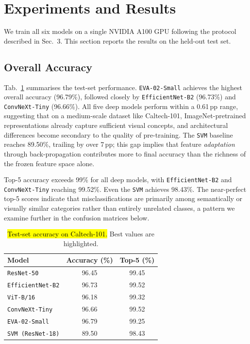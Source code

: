 \section{Experiments and Results}

We train all six models on a single NVIDIA A100 GPU following the protocol described in Sec.~3. This section reports the results on the held-out test set.

\subsection{Overall Accuracy}

Tab.~\ref{tab:main_results} summarises the test-set performance. \texttt{EVA-02-Small} achieves the highest overall accuracy (96.79\%), followed closely by \texttt{EfficientNet-B2} (96.73\%) and \texttt{ConvNeXt-Tiny} (96.66\%). All five deep models perform within a 0.61\,pp range, suggesting that on a medium-scale dataset like Caltech-101, ImageNet-pretrained representations already capture sufficient visual concepts, and architectural differences become secondary to the quality of pre-training. The \texttt{SVM} baseline reaches 89.50\%, trailing by over 7\,pp; this gap implies that feature \emph{adaptation} through back-propagation contributes more to final accuracy than the richness of the frozen feature space alone.

Top-5 accuracy exceeds 99\% for all deep models, with \texttt{EfficientNet-B2} and \texttt{ConvNeXt-Tiny} reaching 99.52\%. Even the \texttt{SVM} achieves 98.43\%. The near-perfect top-5 scores indicate that misclassifications are primarily among semantically or visually similar categories rather than entirely unrelated classes, a pattern we examine further in the confusion matrices below.

\begin{table}[t]
\centering
\caption{\hl{Test-set accuracy on Caltech-101.} Best values are highlighted.}
\label{tab:main_results}
\setlength{\tabcolsep}{6pt}
\small
\begin{tabular}{lcc}
\toprule
Model & Accuracy (\%) & Top-5 (\%) \\
\midrule
\texttt{ResNet-50}          & 96.45 & 99.45 \\
\texttt{EfficientNet-B2}    & 96.73 & \cellcolor{blue!8}99.52 \\
\texttt{ViT-B/16}           & 96.18 & 99.32 \\
\texttt{ConvNeXt-Tiny}      & 96.66 & \cellcolor{blue!8}99.52 \\
\texttt{EVA-02-Small}       & \cellcolor{blue!8}96.79 & 99.25 \\
\texttt{SVM (ResNet-18)}    & 89.50 & 98.43 \\
\bottomrule
\end{tabular}
\end{table}

